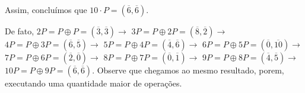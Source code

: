 \begin{exemplo}
	\justify
	Assim, concluímos que $10 \cdot P = (\overline{6},\overline{6}) $.

	De fato, $2P = P \oplus P = (\overline{3},\overline{3}) \rightarrow$ $3P = P
		\oplus 2P = (\overline{8},\overline{2}) \rightarrow $ $4P = P \oplus 3P =
		(\overline{6},\overline{5}) \rightarrow$ $5P = P \oplus 4P =
		(\overline{4},\overline{6}) \rightarrow$ $6P = P \oplus 5P =
		(\overline{0},\overline{10}) \rightarrow$ $7P = P \oplus 6P =
		(\overline{2},\overline{0}) \rightarrow$ $8P = P \oplus 7P =
		(\overline{0},\overline{1}) \rightarrow $ $9P = P \oplus 8P =
		(\overline{4},\overline{5}) \rightarrow$ $ 10P = P \oplus 9P =
		(\overline{6},\overline{6}) $. Observe que chegamos ao mesmo resultado, porem,
	executando uma quantidade maior de operações.
\end{exemplo}

